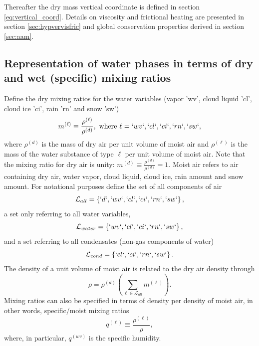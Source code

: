 \documentclass{agujournal}
\begin{document}
{Thereafter the dry mass vertical coordinate is defined in section \ref{eq:vertical_coord}. Details on viscosity and frictional heating are presented in section \ref{sec:hypvervisfric} and global conservation properties derived in section \ref{sec:aam}.
\subsection{Representation of water phases in terms of dry and wet (specific) mixing ratios}\label{sec:mixing_ratios}
Define the dry mixing ratios for the water variables (vapor 'wv', cloud liquid 'cl', cloud ice 'ci', rain 'rn' and snow 'sw')
\begin{equation}
m^{(\ell)}\equiv \frac{\rho^{(\ell)}}{\rho^{(d)}}, \text{ where }\ell=`wv`,`cl`,`ci`,`rn`,`sw`,\label{eq:mx}
\end{equation}
where $\rho^{(d)}$ is the mass of dry air per unit volume of moist air and $\rho^{(\ell)}$ is the mass of the water substance of type $\ell$ per unit volume of moist air. Note that the mixing ratio for dry air is unity: $m^{(d)}\equiv \frac{\rho^{(d)}}{\rho^{(d)}}=1$. 
Moist air refers to air containing dry air, water vapor, cloud liquid, cloud ice, rain amount and snow amount. For notational purposes define the set of all components of air
\begin{equation}
\mathcal{L}_{all}=\left\{ `d`,`wv`,`cl`,`ci`,`rn`,`sw`\right\},
\end{equation}
a set only referring to all water variables,
\begin{equation}
\mathcal{L}_{water}=\left\{`wv`,`cl`,`ci`,`rn`,`sw`\right\},
\end{equation}
and a set referring to all condensates (non-gas components of water)
\begin{equation}
\mathcal{L}_{cond}=\left\{`cl`,`ci`,`rn`,`sw`\right\}.
\end{equation}
The density of a unit volume of moist air is related to the dry air density through
\begin{equation}
\label{eq:rhosum}
\rho=\rho^{(d)}\left(\sum_{\ell \in \mathcal{L}_{all}} m^{(\ell)}\right).
\end{equation}
Mixing ratios can also be specified in terms of density per density of moist air, in other words, specific/moist mixing ratios
\begin{equation}
q^{(\ell)}\equiv \frac{\rho^{(\ell)}}{\rho},\label{eq:qx}
\end{equation}
where, in particular, $q^{(wv)}$ is the specific humidity. 


}
\end{document}
